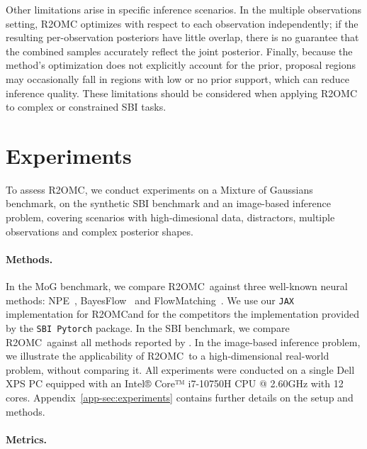 \documentclass[twoside]{article}
\newcommand{\rromc}{R2OMC}
\newcommand{\REJ}{REJ-ABC}
\newcommand{\SMC}{SMC-ABC}
\newcommand{\NPE}{NPE}
\newcommand{\NLE}{NLE}
\newcommand{\NRE}{NRE}
\begin{document}
Other limitations arise in specific inference scenarios. In the multiple observations setting, R2OMC optimizes with respect to each observation independently; if the resulting per-observation posteriors have little overlap, there is no guarantee that the combined samples accurately reflect the joint posterior. Finally, because the method’s optimization does not explicitly account for the prior, proposal regions may occasionally fall in regions with low or no prior support, which can reduce inference quality. These limitations should be considered when applying R2OMC to complex or constrained SBI tasks.

\section{Experiments}
\label{sec:experiments}

To assess \rromc, we conduct experiments on a Mixture of Gaussians benchmark, on the synthetic SBI benchmark and an image-based inference problem, covering scenarios with high-dimesional data, distractors, multiple observations and complex posterior shapes.

\paragraph{Methods.}

In the MoG benchmark, we compare \rromc~against three well-known neural methods: \NPE~\citep{greenberg2019automatic}, BayesFlow~\citep{radev2020bayesflow} and FlowMatching~\citep{wildberger2023flow}.
We use our \texttt{JAX} implementation for \rromc and for the competitors the implementation provided by the \texttt{SBI Pytorch} package.
In the SBI benchmark, we compare \rromc~against all methods reported by \citet{lueckmann2021benchmarking}.
In the image-based inference problem, we illustrate the applicability of \rromc~to a high-dimensional real-world problem, without comparing it.
All experiments were conducted on a single Dell XPS PC equipped with an Intel® Core™ i7-10750H CPU @ 2.60GHz with 12 cores.
Appendix~\ref{app-sec:experiments} contains further details on the setup and methods.

\paragraph{Metrics.}
\end{document}
